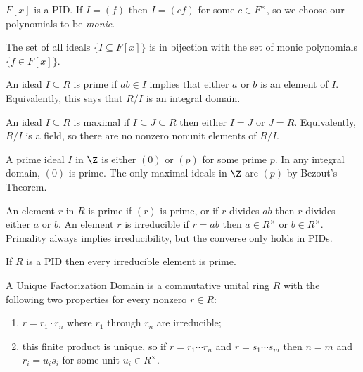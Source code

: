 \begin{corollary}
$F[x]$ is a PID. If $I = (f)$ then $I = (cf)$ for some $c \in F^\times$, so we choose our polynomials to be \emph{monic}.
\end{corollary}

\begin{corollary}
The set of all ideals $\{I \subseteq F[x]\}$ is in bijection with the set of monic polynomials $\{f \in F[x]\}$.
\end{corollary}

\begin{definition}
An ideal $I \subseteq R$ is prime if $ab \in I$ implies that either $a$ or $b$ is an element of $I$. Equivalently, this says that $R / I$ is an integral domain.
\end{definition}

\begin{definition}
An ideal $I \subseteq R$ is maximal if $I \subseteq J \subseteq R$ then either $I = J$ or $J = R$. Equivalently, $R/I$ is a field, so there are no nonzero nonunit elements of $R/I$.
\end{definition}

\begin{example}[Ideals in $\Z$]
A prime ideal $I$ in $\Z$ is either $(0)$ or $(p)$ for some prime $p$. In any integral domain, $(0)$ is prime. The only maximal ideals in $\Z$ are $(p)$ by Bezout's Theorem.
\end{example}

\begin{definition}
An element $r$ in $R$ is prime if $(r)$ is prime, or if $r$ divides $ab$ then $r$ divides either $a$ or $b$. An element $r$ is irreducible if $r = ab$ then $a \in R^\times$ or $b \in R^\times$. Primality always implies irreducibility, but the converse only holds in PIDs.
\end{definition}

\begin{lemma}
If $R$ is a PID then every irreducible element is prime.
\end{lemma}

\begin{definition}[UFD]
A Unique Factorization Domain is a commutative unital ring $R$ with the following two properties for every nonzero $r \in R$:
\begin{enumerate}
\item $r = r_1 \cdot r_n$ where $r_1$ through $r_n$ are irreducible;
\item this finite product is unique, so if $r = r_1 \cdots r_n$ and $r = s_1 \cdots s_m$ then $n = m$ and $r_i = u_i s_i$ for some unit $u_i \in R^\times$.
\end{enumerate}
\end{definition}

